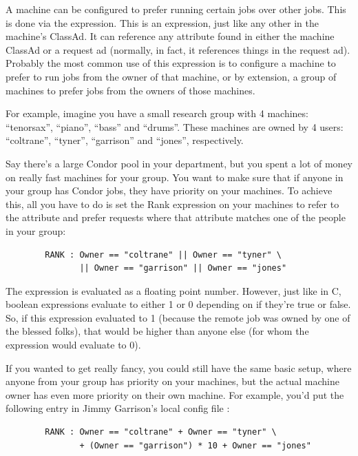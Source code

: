 A machine can be configured to prefer running certain jobs over other
jobs.  This is done via the  expression.  This is an
expression, just like any other in the machine's ClassAd.  It can
reference any attribute found in either the machine ClassAd or a
request ad (normally, in fact, it references things in the request
ad).  Probably the most common use of this expression is to configure a
machine to prefer to run jobs from the owner of that machine, or by
extension, a group of machines to prefer jobs from the owners of those
machines.  

For example, imagine you have a small research group with 4 machines:
``tenorsax'', ``piano'', ``bass'' and ``drums''.  These machines are
owned by 4 users: ``coltrane'', ``tyner'', ``garrison'' and ``jones'',
respectively.  

Say there's a large Condor pool in your department, but you spent a
lot of money on really fast machines for your group.  You want to make
sure that if anyone in your group has Condor jobs, they have priority
on your machines.  To achieve this, all you have to do is set the Rank
expression on your machines to refer to the  attribute and
prefer requests where that attribute matches one of the people in your
group:
\begin{verbatim}
        RANK : Owner == "coltrane" || Owner == "tyner" \
               || Owner == "garrison" || Owner == "jones"
\end{verbatim}

The  expression is evaluated as a floating point number.
However, just like in C, boolean expressions evaluate to either 1 or 0
depending on if they're true or false.  So, if this expression
evaluated to 1 (because the remote job was owned by one of the blessed
folks), that would be higher than anyone else (for whom the expression
would evaluate to 0).

If you wanted to get really fancy, you could still have the same basic
setup, where anyone from your group has priority on your machines, but
the actual machine owner has even more priority on their own machine.
For example, you'd put the following entry in Jimmy Garrison's local
config file \File{bass.local}:
\begin{verbatim}
        RANK : Owner == "coltrane" + Owner == "tyner" \
               + (Owner == "garrison") * 10 + Owner == "jones"
\end{verbatim}

